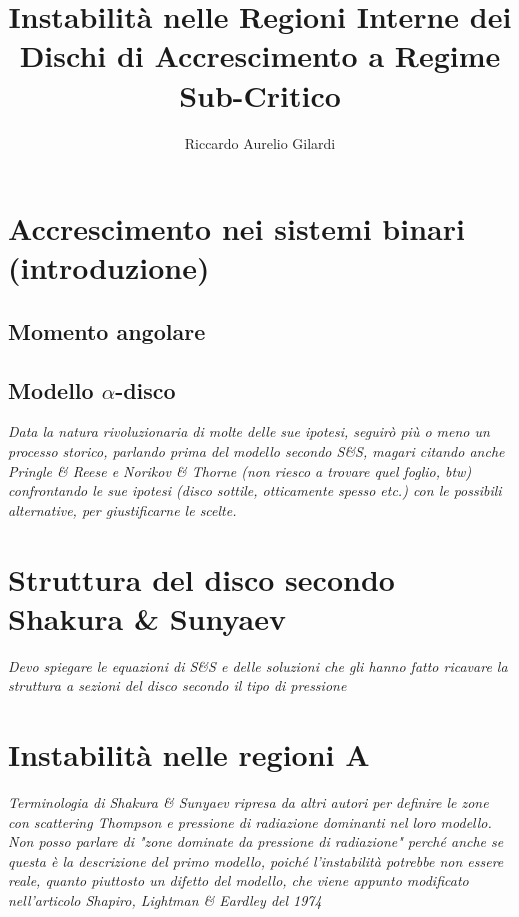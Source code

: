 \documentclass[a4paper]{article}
\newcommand{\subtitle}[1]{%
	\posttitle{%
		\par\end{center}
	\begin{center}\large#1\end{center}
	\vskip0.5em}%
}
\begin{document}
\title{Instabilità nelle Regioni Interne dei Dischi di Accrescimento a Regime Sub-Critico}
\subtitle{Appunti}
\author{Riccardo Aurelio Gilardi}
\maketitle

\newpage
\tableofcontents
\newpage

\section{Accrescimento nei sistemi binari (introduzione)}
	\subsection{Momento angolare}
	\subsection{Modello $\alpha$-disco}
	
		\emph{Data la natura rivoluzionaria di molte delle sue ipotesi, seguirò più o meno un processo storico, parlando prima del modello secondo S\&S, magari citando anche Pringle \& Reese e Norikov \& Thorne (non riesco a trovare quel foglio, btw) confrontando le sue ipotesi (disco sottile, otticamente spesso etc.) con le possibili alternative, per giustificarne le scelte.}

\section{Struttura del disco secondo Shakura \& Sunyaev}

	\emph{Devo spiegare le equazioni di S\&S e delle soluzioni che gli hanno fatto ricavare la struttura a sezioni del disco secondo il tipo di pressione}

\section{Instabilità nelle regioni A}

	\emph{Terminologia di Shakura \& Sunyaev ripresa da altri autori per definire le zone con scattering Thompson e pressione di radiazione dominanti nel loro modello.\\Non posso parlare di "zone dominate da pressione di radiazione" perché anche se questa è la descrizione del primo modello, poiché l'instabilità potrebbe non essere reale, quanto piuttosto un difetto del modello, che viene appunto modificato nell'articolo Shapiro, Lightman \& Eardley del 1974}\\
	
\end{document}
